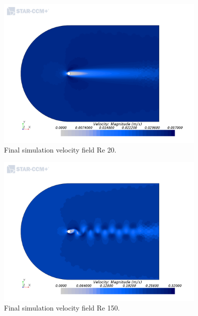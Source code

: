 \documentclass[10pt,english]{article}
\begin{document}
 \begin{figure}[h]
\centering
\includegraphics[trim={0.0cm 0cm 0.0cm 0cm},clip,width=0.9\textwidth]{cylinder_2_016_ScalarScene1_re20.png}
\vspace{-5pt}
\caption{Final simulation velocity field Re 20.}
\label{f:cylinder_2_016_ScalarScene1_re20}
\end{figure}

 \begin{figure}[h]
\centering
\includegraphics[trim={0.0cm 0cm 0.0cm 0cm},clip,width=0.9\textwidth]{cylinder_2_016_ScalarScene1.png}
\vspace{-5pt}
\caption{Final simulation velocity field Re 150. }
\label{f:cylinder_2_016_ScalarScene1}
\end{figure}
\end{document}
